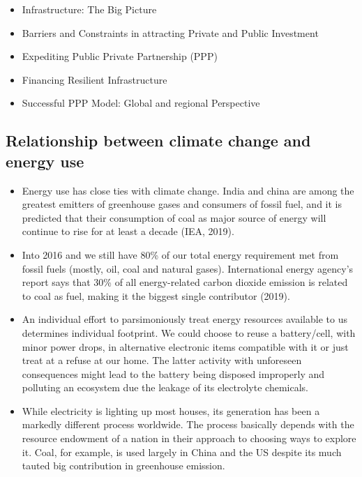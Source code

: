 \documentclass[
  openany]{book}
\providecommand{\tightlist}{%
  \setlength{\itemsep}{0pt}\setlength{\parskip}{0pt}}
\begin{document}
\begin{itemize}
\tightlist
\item
  Infrastructure: The Big Picture
\item
  Barriers and Constraints in attracting Private and Public Investment
\item
  Expediting Public Private Partnership (PPP)
\item
  Financing Resilient Infrastructure
\item
  Successful PPP Model: Global and regional Perspective
\end{itemize}

\hypertarget{relationship-between-climate-change-and-energy-use}{%
\subsection{Relationship between climate change and energy use}\label{relationship-between-climate-change-and-energy-use}}

\begin{itemize}
\tightlist
\item
  Energy use has close ties with climate change. India and china are among the greatest emitters of greenhouse gases and consumers of fossil fuel, and it is predicted that their consumption of coal as major source of energy will continue to rise for at least a decade (IEA, 2019).
\item
  Into 2016 and we still have 80\% of our total energy requirement met from fossil fuels (mostly, oil, coal and natural gases). International energy agency's report says that 30\% of all energy-related carbon dioxide emission is related to coal as fuel, making it the biggest single contributor (2019).
\item
  An individual effort to parsimoniously treat energy resources available to us determines individual footprint. We could choose to reuse a battery/cell, with minor power drops, in alternative electronic items compatible with it or just treat at a refuse at our home. The latter activity with unforeseen consequences might lead to the battery being disposed improperly and polluting an ecosystem due the leakage of its electrolyte chemicals.
\item
  While electricity is lighting up most houses, its generation has been a markedly different process worldwide. The process basically depends with the resource endowment of a nation in their approach to choosing ways to explore it. Coal, for example, is used largely in China and the US despite its much tauted big contribution in greenhouse emission.
\end{itemize}
\end{document}
